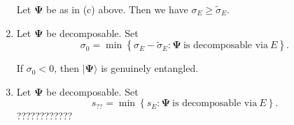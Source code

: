 \documentclass[a4paper,12pt]{article}
\theoremstyle{definition}
\theoremstyle{underlinethm}
\theoremstyle{definition}
\begin{document}
\begin{enumerate}[label=(\alph*)]
Let $\boldsymbol{\Psi}$ be as in (c) above. Then we have $\sigma_{E} \geq \widetilde{\sigma}_{E}$.

\item Let $\boldsymbol{\Psi}$ be decomposable. Set
$$
\sigma_{0} = \min \left\{\sigma_{E}- \widetilde{\sigma}_{E} : \boldsymbol{\Psi}~\text{is decomposable via}~ E\right\}.
$$

If $\sigma_{0} < 0$, then $| \boldsymbol{\Psi}\rangle$ is genuinely entangled.

\item Let $\boldsymbol{\Psi}$ be decomposable. Set
$$
s_{??} = \min \left\{s_{E} : \boldsymbol{\Psi}~ \text{is decomposable via}~E \right\}.
$$
 ????????????
\end{enumerate}
\end{document}
